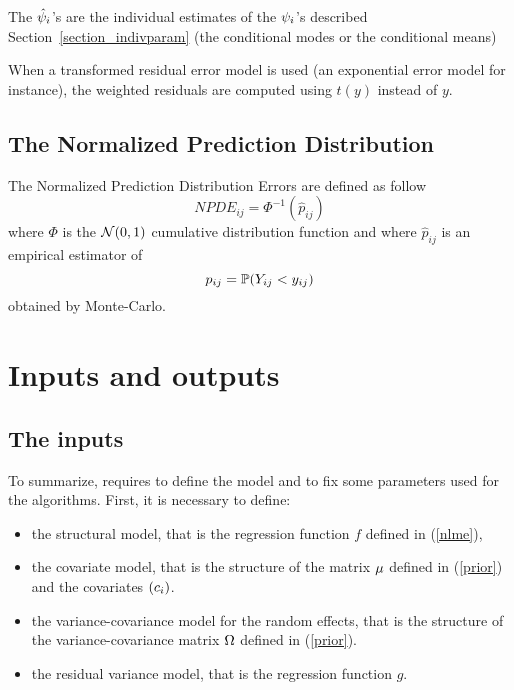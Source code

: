 The $\hat{\psi}_i$'s are the individual estimates of the ${\psi}_i$'s described Section~\ref{section_indivparam} (the conditional modes or the conditional means)


 When a transformed residual error model is used (an exponential error model for instance), the weighted residuals are computed using $t(y)$ instead of $y$.

\subsection{The Normalized Prediction Distribution }
The Normalized Prediction Distribution Errors are defined as follow
$$NPDE_{ij}=\Phi^{-1}(\hat{p}_{ij})$$
where $\Phi$ is the $\mbox{$\mathcal{N}$}(0,1)$ cumulative distribution function and where $\hat{p}_{ij}$ is an empirical estimator of
$$p_{ij} = \mathbb{P}\!\left(Y_{ij}<y_{ij}\right)$$
obtained by Monte-Carlo.


\section{Inputs and outputs}
\subsection{The inputs}

To summarize, \monolix requires to define the model and to fix some parameters used for the
algorithms. First, it is necessary to define:
\begin{itemize}
\item the structural model, that is the regression function $f$ defined in (\ref{nlme}),
\item the covariate model, that is the structure of the matrix $\fixed_effect$ defined in (\ref{prior}) and the covariates $(c_i)$.
\item the variance-covariance model for the random effects, that is the structure of the variance-covariance matrix ${\Omega}$
defined in (\ref{prior}).
\item the residual variance model, that is the regression function $g$.
\end{itemize}

